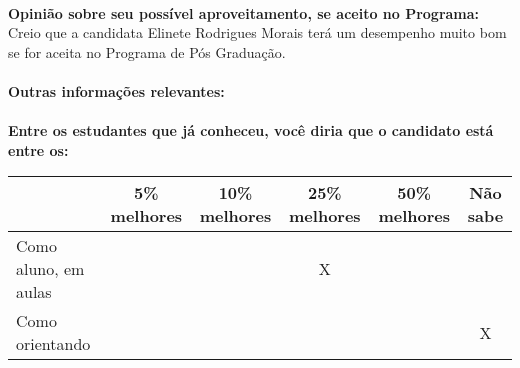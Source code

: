 \documentclass[11pt]{article}
\begin{document}
\\
\textbf{Opinião sobre seu possível aproveitamento, se aceito no Programa:}
\\Creio que a candidata Elinete Rodrigues Morais terá um desempenho muito bom se for aceita no Programa  de Pós Graduação.\\ 
\\
\textbf{Outras informações relevantes:} \\
\\[0.3cm]
\textbf{Entre os estudantes que já conheceu, você diria que o candidato está entre os:}
\\
\begin{tabular}{|l|c|c|c|c|c|}
\hline
 & 5\% melhores & 10\% melhores & 25\% melhores & 50\% melhores & Não sabe \\
\hline
Como aluno, em aulas &  &  & X &  & \\
\hline
Como orientando &  &  &  &  & X\\
\hline
\end{tabular}
\end{document}
